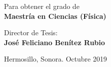 \bigskip

\begin{center}
    Para obtener el grado de \\
    \Large{\textbf{Maestr\'ia en Ciencias (F\'isica)}}
\end{center}

\bigskip


\bigskip
\begin{center}
    Director de Tesis: \\
   \Large{\textbf{Jos\'e Feliciano Ben\'itez Rubio}}
\end{center}
\bigskip
\bigskip
\bigskip

Hermosillo, Sonora.
\hfill
Octubre 2019
